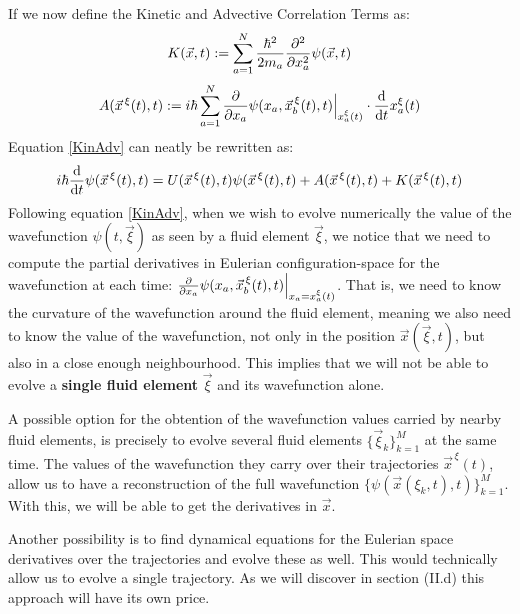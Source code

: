 \documentclass[11pt, a4paper]{article} %
\begin{document}
If we now define the Kinetic and Advective Correlation Terms as:\vspace{-0.1cm}
\begin{equation}\label{Kin}
K(\vec{x},t):=\sum_{a=1}^N \frac{\hbar^2}{2m_a}\pdv[2]{}{x_a}\psi(\vec{x},t)
\end{equation}\vspace{-0.1cm}
\begin{equation}\label{Adv}
A(\vec{x}^{\, \xi}(t),t):=i\hbar \sum_{a=1}^N \pdv{}{x_a}\psi(x_a,\vec{x}_b^{\, \xi}(t), t)\Big\rvert_{x^\xi_a(t)}\cdot \dv{}{t}x^\xi_a(t)
\end{equation}
Equation \eqref{KinAdv} can neatly be rewritten as:\vspace{-0.1cm}
\begin{equation}
i\hbar \dv{}{t}\psi(\vec{x}^{\, \xi}(t),t)=U(\vec{x}^{\, \xi}(t),t)\psi(\vec{x}^{\, \xi}(t),t)+A(\vec{x}^{\, \xi}(t),t)+K(\vec{x}^{\, \xi}(t),t)\vspace{-0.1cm}
\end{equation}
Following equation \eqref{KinAdv}, when we wish to evolve numerically the value of the wavefunction  $\psi(t,\vec{\xi})$ as seen by a fluid element $\vec{\xi}$, we notice that we need to compute the partial derivatives in Eulerian configuration-space for the wavefunction at each time: $\pdv{}{x_a}\psi(x_a,\vec{x}_b^{\, \xi}(t), t)\Big\rvert_{x_a=x^\xi_a(t)}$. That is, we need to know the curvature of the wavefunction around the fluid element, meaning we also need to know the value of the wavefunction, not only in the position $\vec{x}(\vec{\xi},t)$, but also in a close enough neighbourhood. This implies that we will not be able to evolve a {\bf single fluid element} $\vec{\xi}$ and its wavefunction alone. 

A possible option for the obtention of the wavefunction values carried by nearby fluid elements, is precisely to evolve several fluid elements $\{\vec{\xi}_k\}_{k=1}^M$ at the same time. The values of the wavefunction they carry over their trajectories $\vec{x}^{\, \xi}(t)$, allow us to have a reconstruction of the full wavefunction $\{\psi(\vec{x}(\xi_k,t),t) \}_{k=1}^M$. With this, we will be able to get the derivatives in $\vec{x}$.

Another possibility is to find dynamical equations for the Eulerian space derivatives over the trajectories and evolve these as well. This would technically allow us to evolve a single trajectory. As we will discover in section (II.d) this approach will have its own price.
\end{document}
